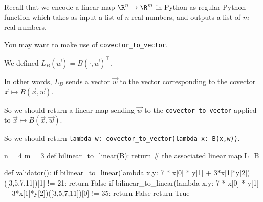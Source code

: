 \documentclass{ximera}
\begin{document}
\begin{question}
  Recall that we encode a linear map $\R^n \to \R^m$ in Python as regular Python function which takes as input a list of $n$ real numbers, and outputs a list of $m$ real numbers.

  \begin{solution}
    \begin{hint}
      You may want to make use of \texttt{covector\_to\_vector}.
    \end{hint}
    \begin{hint}
      We defined $L_B(\vec{w}) = B(\cdot,\vec{w})^\top$.
    \end{hint}
    \begin{hint}
      In other words, $L_B$ sends a vector $\vec{w}$ to the vector corresponding to the covector $\vec{x} \mapsto B(\vec{x},\vec{w})$.
    \end{hint}
    \begin{hint}
      So we should return a linear map sending $\vec{w}$ to the \texttt{covector\_to\_vector} applied to $\vec{x} \mapsto B(\vec{x},\vec{w})$.
    \end{hint}
    \begin{hint}
      So we should return \texttt{lambda w: covector\_to\_vector(lambda x: B(x,w))}.
    \end{hint}
    \begin{python}
n = 4
m = 3
def bilinear_to_linear(B):
  return # the associated linear map L_B

def validator():
  if bilinear_to_linear(lambda x,y: 7 * x[0] * y[1] + 3*x[1]*y[2])([3,5,7,11])[1] != 21:
    return False
  if bilinear_to_linear(lambda x,y: 7 * x[0] * y[1] + 3*x[1]*y[2])([3,5,7,11])[0] != 35:
    return False
  return True
    \end{python}
  \end{solution}

\end{question}
\end{document}

